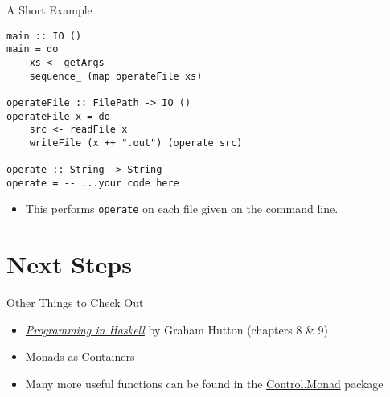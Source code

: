 \documentclass{beamer}
\begin{document}
\begin{frame}[containsverbatim]{A Short Example}
\begin{lstlisting}
main :: IO ()
main = do
    xs <- getArgs
    sequence_ (map operateFile xs)

operateFile :: FilePath -> IO ()
operateFile x = do
    src <- readFile x
    writeFile (x ++ ".out") (operate src)

operate :: String -> String
operate = -- ...your code here
\end{lstlisting}
\begin{itemize}
\item This performs \lstinline{operate} on each file given on the command line.
\end{itemize}
\end{frame}


\section{Next Steps}

\begin{frame}{Other Things to Check Out}
\begin{itemize}
\item \href{http://www.cs.nott.ac.uk/~gmh/book.html}{\emph{Programming in Haskell}} by Graham Hutton (chapters 8 \& 9)
\item \href{https://wiki.haskell.org/Monads_as_Containers}{Monads as Containers}
\item Many more useful functions can be found in the \href{http://haskell.org/ghc/docs/latest/html/libraries/base/Control-Monad.html}{Control.Monad} package
\end{itemize}
\end{frame}
\end{document}
